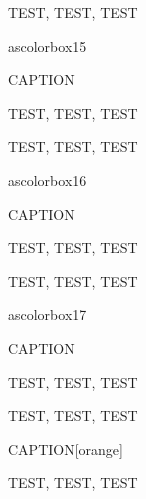 \begin{ascolorbox14}{}

TEST, TEST, TEST

\end{ascolorbox14}

ascolorbox15

\begin{ascolorbox15}{CAPTION}

TEST, TEST, TEST

\end{ascolorbox15}

\begin{ascolorbox15}{}

TEST, TEST, TEST

\end{ascolorbox15}

ascolorbox16

\begin{ascolorbox16}{CAPTION}

TEST, TEST, TEST

\end{ascolorbox16}

\begin{ascolorbox16}{}

TEST, TEST, TEST

\end{ascolorbox16}

ascolorbox17

\begin{ascolorbox17}{CAPTION}

TEST, TEST, TEST

\end{ascolorbox17}

\begin{ascolorbox17}{}

TEST, TEST, TEST

\end{ascolorbox17}

\begin{ascolorbox17}{CAPTION}[orange]

TEST, TEST, TEST

\end{ascolorbox17}

